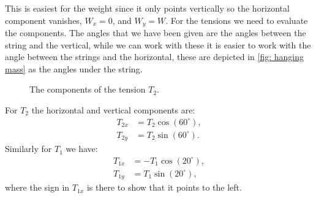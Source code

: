 \documentclass[a4paper,12pt]{book}
\begin{document}
This is easiest for the weight since it only points vertically so the horizontal component vanishes, $W_{x}=0$, and $W_{y}=W$. For the tensions we need to evaluate the components. The angles that we have been given are the angles between the string and the vertical, while we can work with these it is easier to work with the angle between the strings and the horizontal, these are depicted in \cref{fig: hanging mass} as the angles under the string.

\begin{figure}[ht]
    \centering
    \caption{The components of the tension $T_{2}$.}
    \label{fig: Tension components}
\end{figure}

For $T_{2}$ the horizontal and vertical components are:
\begin{align*}
T_{2x}&=T_{2}\cos(60^{\circ}),\\
T_{2y}&=T_{2}\sin(60^{\circ}).
\end{align*}
Similarly for $T_{1}$ we have:
\begin{align*}
T_{1x}&=-T_{1}\cos(20^{\circ}),\\
T_{1y}&=T_{1}\sin(20^{\circ}),
\end{align*}
where the sign in $T_{1x}$ is there to show that it points to the left.\\
\end{document}
